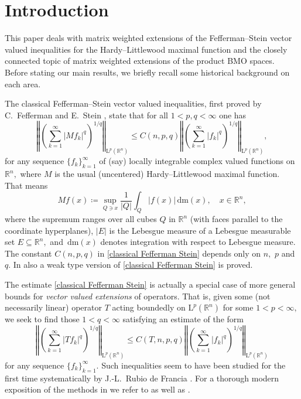 \documentclass{article}
\theoremstyle{definition}
\theoremstyle{remark}
\numberwithin{equation}{section}
\newcommand{\mathdm}{\,\mathrm{dm}}
\newcommand{\reals}{\mathbb{R}}
\newcommand{\Lp}[1]{\mathrm{L}^{#1}}
\newcommand{\1}{\mathbf{1}}
\begin{document}
    \section{Introduction}

    This paper deals with matrix weighted extensions of the Fefferman--Stein vector valued inequalities for the Hardy--Littlewood maximal function and the closely connected topic of matrix weighted extensions of the product BMO spaces. Before stating our main results, we briefly recall some historical background on each area.

    The classical Fefferman--Stein vector valued inequalities, first proved by C.~Fefferman and E.~Stein \cite{Fefferman_Stein_1971}, state that for all $1<p,q<\infty$ one has
    \begin{equation}
        \label{classical Fefferman Stein}
        \left\Vert\left(\sum_{k=1}^{\infty}|Mf_k|^{q}\right)^{1/q}\right\Vert_{\Lp{p}(\reals^n)}\leq C(n,p,q)\left\Vert\left(\sum_{k=1}^{\infty}|f_k|^{q}\right)^{1/q}\right\Vert_{\Lp{p}(\reals^n)},
    \end{equation}
    for any sequence $\{f_k\}_{k=1}^{\infty}$ of (say) locally integrable complex valued functions on $\reals^n,$ where $M$ is the usual (uncentered) Hardy--Littlewood maximal function. That means
    \begin{equation*}
        Mf(x)\coloneq \sup_{Q\ni x}\frac{1}{|Q|}\int_{Q}|f(x)|\mathdm(x),\quad x\in\reals^n,
    \end{equation*}
    where the supremum ranges over all cubes $Q$ in $\reals^n$ (with faces parallel to the coordinate hyperplanes), $|E|$ is the Lebesgue measure of a Lebesgue measurable set $E\subseteq\reals^n,$ and $\mathdm(x)$ denotes integration with respect to Lebesgue measure. The constant $C(n,p,q)$ in \eqref{classical Fefferman Stein} depends only on $n,$ $p$ and $q.$ In \cite{Fefferman_Stein_1971} also a weak type version of \eqref{classical Fefferman Stein} is proved.

    The estimate \eqref{classical Fefferman Stein} is actually a special case of more general bounds for \emph{vector valued extensions} of operators. That is, given some (not necessarily linear) operator $T$ acting boundedly on $\Lp{p}(\reals^n)$ for some $1<p<\infty,$ we seek to find those $1<q<\infty$ satisfying an estimate of the form
    \begin{equation}
        \label{vector valued inequalities}
        \left\Vert\left(\sum_{k=1}^{\infty}|Tf_k|^{q}\right)^{1/q}\right\Vert_{\Lp{p}(\reals^n)}\leq C(T,n,p,q)\left\Vert\left(\sum_{k=1}^{\infty}|f_k|^{q}\right)^{1/q}\right\Vert_{\Lp{p}(\reals^n)}
    \end{equation}
    for any sequence $\{f_k\}^{\infty}_{k=1}.$ Such inequalities seem to have been studied for the first time systematically by J.-L.~Rubio de Francia \cite{Rubio_de_Francia_1985}. For a thorough modern exposition of the methods in \cite{Rubio_de_Francia_1985} we refer to \cite{Tao_notes_5_247A} as well as \cite{Grafakos_Book_1}.
    
\end{document}
